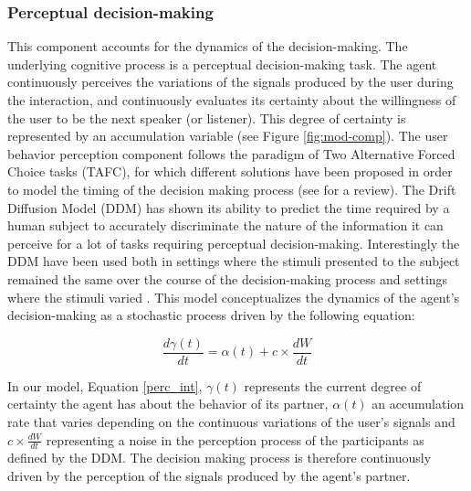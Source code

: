 
\subsubsection{Perceptual decision-making}

This component accounts for the dynamics of the decision-making. The underlying cognitive process is a perceptual decision-making task. The agent continuously perceives the variations of the signals produced by the user during the interaction, and continuously evaluates its certainty about the willingness of the user to be the next speaker (or listener). This degree of certainty is represented by an accumulation variable (see Figure \ref{fig:mod-comp}).
The user behavior perception component follows the paradigm of Two Alternative Forced Choice tasks (TAFC), for which different solutions have been proposed in order to model the timing of the decision making process (see \citep{bogacz_physics_2006} for a review). 
The Drift Diffusion Model (DDM) has shown its ability to predict the time required by a human subject to accurately discriminate the nature of the information it can perceive for a lot of tasks requiring perceptual decision-making. 
Interestingly the DDM have been used both in settings where the stimuli presented to the subject remained the same over the course of the decision-making process and settings where the stimuli varied \cite{ratcliff_note_1980}. This model conceptualizes the dynamics of the agent's decision-making as a stochastic process driven by the following equation:

\begin{equation}
  \frac{d\gamma(t)}{dt}=\alpha(t)+c\times\frac{dW}{dt}
  \label{perc_int}
\end{equation}

In our model, Equation \ref{perc_int}, $\gamma(t)$ represents the current degree of certainty the agent has about the behavior of its partner, $\alpha(t)$ an accumulation rate that varies depending on the continuous variations of the user's signals and $c\times\frac{dW}{dt}$ representing a noise in the perception process of the participants as defined by the DDM. The decision making process is therefore continuously driven by the perception of the signals produced by the agent's partner.


